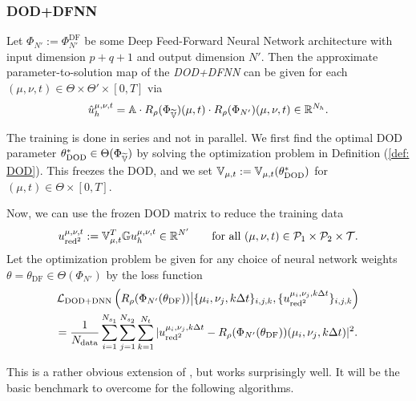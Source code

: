 \subsubsection{DOD+DFNN} \label{subsec: DOD+DFNN}

Let $\Phi_{N'} := \Phi_{N'}^\text{DF}$ 
be some Deep Feed-Forward Neural Network architecture
with input dimension $p+q+1$ and output dimension $N'$. Then the approximate parameter-to-solution map 
of the \emph{DOD+DFNN}
can be given for each $(\mu, \nu, t) \in \Theta \times \Theta'
\times [0, T]$ via
\begin{equation} \label{eq: dod+dnn solution}
    \hat{u}_h^{\mu, \nu, t} = \mathbb{A} \cdot R_\rho(\Phi_{\widetilde{\mathbb{V}}})(\mu, t) \cdot R_\rho(\Phi_{N'})(\mu, \nu, t) \in \mathbb{R}^{N_h}.
\end{equation}

The training is done in series and not in parallel.
We first find the optimal DOD parameter $\theta^*_\text{DOD} \in \Theta(\Phi_{\widetilde{\mathbb{V}}})$ by 
solving the optimization problem
in Definition (\ref{def: DOD}). This freezes the DOD, and we set $\mathbb{V}_{\mu, t} := \mathbb{V}_{\mu, t}(\theta^*_\text{DOD})$ for 
$(\mu, t) \in \Theta \times [0, T]$.

Now, we can use the frozen DOD matrix to reduce the training data
\begin{equation*}
    u_{\text{red}^2}^{\mu, \nu, t} := \mathbb{V}_{\mu, t}^T \mathbb{G} u_h^{\mu, \nu, t} \in \mathbb{R}^{N'} 
    \qquad \text{for all } (\mu, \nu, t) \in \mathcal{P}_1 \times \mathcal{P}_2 \times \mathcal{T}.
\end{equation*}
Let the optimization problem be given for any choice of neural network weights $\theta = \theta_\text{DF} \in \Theta(\Phi_{N'})$
by the loss function
\begin{multline} \label{eq: loss dod+dnn}
    \mathcal{L}_\text{DOD+DNN}\left(R_\rho(\Phi_{N'}(\theta_\text{DF})) \big\vert \{\mu_i, \nu_j, k \Delta t\}_{i,j,k}, 
    \{u_{\text{red}^2}^{\mu_i, \nu_j, k \Delta t} \}_{i,j,k}\right) \\
    = \frac{1}{N_\text{data}}\sum_{i=1}^{N_{s_1}} \sum_{j=1}^{N_{s_2}} 
    \sum_{k = 1}^{N_t} \, \lvert u_{\text{red}^2}^{\mu_i, \nu_j, k \Delta t} - 
    R_\rho(\Phi_{N'}(\theta_\text{DF}))(\mu_i, \nu_j, k \Delta t) \rvert^2.
\end{multline}

This is a rather obvious extension of \cite{franco2024}, but works surprisingly well. 
It will be the basic benchmark to overcome for the following algorithms. 





